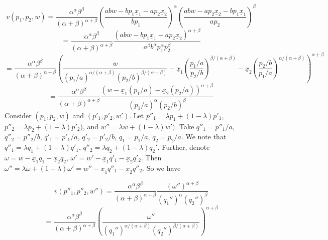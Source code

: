 \documentclass[10pt,letter]{article}
\begin{document}
\[ v(p_1, p_2, w)  = \frac{\alpha^\alpha \beta^\beta}{(\alpha+\beta)^{\alpha + \beta}}\left(\frac{abw - bp_1\underline{x}_1- ap_2 \underline{x}_2}{ b p_1} \right)^\alpha\left(\frac{ab w -ap_2\underline{x}_2 - bp_1\underline{x}_1}{a p_2} \right)^\beta \]
\[ = \frac{\alpha^\alpha \beta^\beta}{(\alpha+\beta)^{\alpha + \beta}}\frac{(abw - bp_1\underline{x}_1- ap_2 \underline{x}_2)^{\alpha + \beta}}{ a^\beta b^\alpha p_1^\alpha p_2^\beta}  \]
\[ = \frac{\alpha^\alpha \beta^\beta}{(\alpha+\beta)^{\alpha + \beta}}\left(\frac{w}{(p_1/a)^{\alpha/(\alpha+\beta)}(p_2/b)^{\beta/(\alpha+\beta)}} - \underline{x}_1\left(\frac{p_1/a}{p_2/b}\right)^{\beta/(\alpha+\beta)}- \underline{x}_2 \left(\frac{p_2/b}{p_1/a}\right)^{\alpha/(\alpha+\beta)} \right)^{\alpha + \beta}  \]
\[ = \frac{\alpha^\alpha \beta^\beta}{(\alpha+\beta)^{\alpha + \beta}}\frac{\left(w - \underline{x}_1(p_1/a)- \underline{x}_2(p_2/a) \right)^{\alpha + \beta}}{(p_1/a)^\alpha(p_2/b)^\beta}  \]
Consider $(p_1, p_2, w)$ and $(p'_1, p'_2, w')$. Let $p''_1 = \lambda p_1 + (1-\lambda)p'_1$, $p''_2 = \lambda p_2 + (1-\lambda)p'_2)$, and $w''=\lambda w + (1-\lambda)w')$. Take $q''_1 = p''_1/a$, $q''_2=p''_2/b$, $q'_1 = p'_1/a$, $q'_2= p'_2/b$, $q_1 = p_1/a$, $q_2 = p_2/a$. We note that $q''_1 = \lambda q_1 + (1-\lambda) q'_1$, $q''_2 = \lambda q_2 + (1-\lambda) q_2'$. Further, denote $\omega = w - \underline{x}_1q_1- \underline{x}_2 q_2$, $\omega' = w' - \underline{x}_1q'_1- \underline{x}_2 q'_2$. Then $\omega'' = \lambda \omega + (1-\lambda) \omega' = w'' - \underline{x}_1q''_1 - \underline{x}_2 q''_2$. So we have

\[ v(p''_1, p''_2, w'') =  \frac{\alpha^\alpha \beta^\beta}{(\alpha+\beta)^{\alpha + \beta}}\frac{(\omega'')^{\alpha + \beta}}{(q_1'')^\alpha (q_2'')^\beta} \]\[ = \frac{\alpha^\alpha \beta^\beta}{(\alpha+\beta)^{\alpha + \beta}}\left(\frac{\omega''}{(q_1'')^{\alpha/(\alpha+\beta)} (q_2'')^{\beta/(\alpha+\beta)}} \right)^{\alpha + \beta} \]
\end{document}
